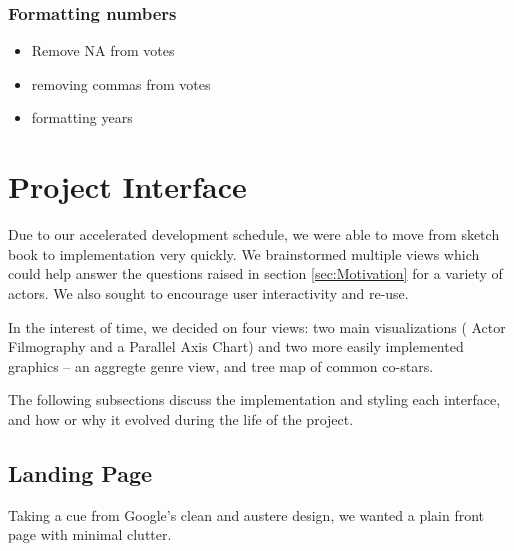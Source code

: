 \documentclass[12pt]{article}
\begin{document}
\subsubsection{Formatting numbers}
	
	\begin{itemize}
		\item Remove NA from votes
		\item removing commas from votes
		\item formatting years
	\end{itemize}


\newpage 

\section{Project Interface}
Due to our accelerated development schedule, we were able to move from sketch book to implementation very quickly. We brainstormed multiple views which could help answer the questions raised in section \ref{sec:Motivation} for a variety of actors.  We also sought to encourage user interactivity and re-use.  

In the interest of time, we  decided on four views:  two main visualizations ( Actor Filmography and a Parallel Axis Chart) and two more easily implemented graphics -- an aggregte genre view, and tree map of common co-stars.

The following subsections discuss the implementation and styling each interface, and how or why it evolved during the life of the project.  

\subsection{Landing Page}

  Taking a cue from Google's clean and austere design, we wanted a plain front page with minimal clutter.
  
\end{document}
